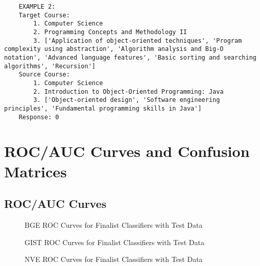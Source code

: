 \begin{lstlisting}
    EXAMPLE 2:
    Target Course:
        1. Computer Science
        2. Programming Concepts and Methodology II
        3. ['Application of object-oriented techniques', 'Program complexity using abstraction', 'Algorithm analysis and Big-O notation', 'Advanced language features', 'Basic sorting and searching algorithms', 'Recursion']
    Source Course:
        1. Computer Science
        2. Introduction to Object-Oriented Programming: Java
        3. ['Object-oriented design', 'Software engineering principles', 'Fundamental programming skills in Java']
    Response: 0
\end{lstlisting}

\chapter{ROC/AUC Curves and Confusion Matrices}\label{app:roc_cm}

\clearpage
\section{ROC/AUC Curves}

\begin{figure}[!h]
    \captionsetup{skip=5pt}
    \centering
    \caption{BGE ROC Curves for Finalist Classifiers with Test Data}
\end{figure}

\begin{figure}[!h]
    \captionsetup{skip=5pt}
    \centering
    \caption{GIST ROC Curves for Finalist Classifiers with Test Data}
\end{figure}

\begin{figure}[!h]
    \captionsetup{skip=5pt}
    \centering
    \caption{NVE ROC Curves for Finalist Classifiers with Test Data}
\end{figure}

